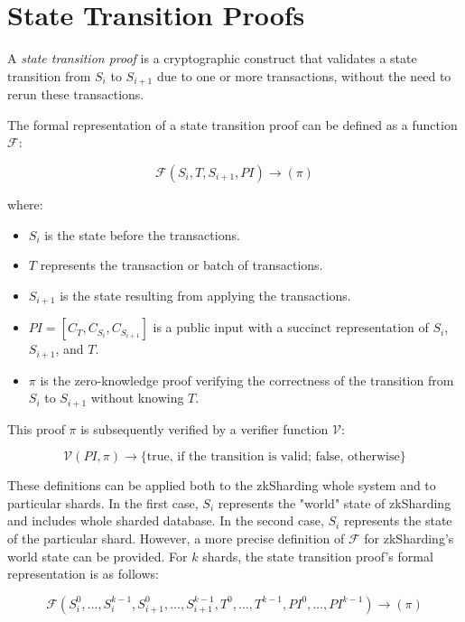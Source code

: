\section{State Transition Proofs}
\label{section:zk}

A \textit{state transition proof} is a cryptographic construct
 that validates a state transition from $S_i$ to $S_{i+1}$
 due to one or more transactions, 
 without the need to rerun these transactions.

The formal representation of a state transition proof
 can be defined as a function $\mathcal{F}$:

\begin{equation}
\label{equation:state-transition}
    \mathcal{F}(S_i, T, S_{i+1}, PI) \rightarrow (\pi)
\end{equation}

where:
\begin{itemize}
  \item $S_i$ is the state before the transactions.
  \item $T$ represents the transaction or batch of transactions.
  \item $S_{i+1}$ is the state resulting from applying the transactions.
  \item $PI = [C_T, C_{S_i}, C_{S_{i + 1}}]$ is a public input
   with a succinct representation of $S_i$, $S_{i+1}$, and $T$.
  \item $\pi$ is the zero-knowledge proof verifying the correctness of the transition
   from $S_i$ to $S_{i+1}$ without knowing $T$.
\end{itemize}

This proof $\pi$ is subsequently verified by a verifier function $\mathcal{V}$:

\[
\mathcal{V}(PI, \pi) \rightarrow \{\text{true, if the transition is valid; false, otherwise}\}
\]

These definitions can be applied both to the zkSharding whole system
 and to particular shards.
In the first case, $S_i$ represents the "world" state of zkSharding and includes whole sharded database.
In the second case, $S_i$ represents the state of the particular shard.
However, a more precise definition of $\mathcal{F}$ for zkSharding's world state can be provided. 
For $k$ shards, the state transition proof's formal representation is as follows:

\begin{equation}
\label{equation:global-state-transition}
    \mathcal{F}(S^0_i, \dots, S^{k-1}_i, S^0_{i+1}, \dots, S^{k-1}_{i+1}, T^0, \dots, T^{k-1}, PI^0, \dots, PI^{k-1}) \rightarrow (\pi)  
\end{equation}

